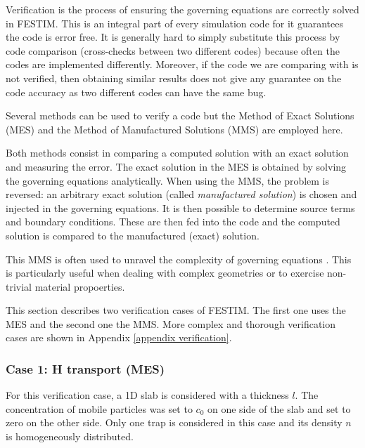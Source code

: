 Verification is the process of ensuring the governing equations are correctly solved in FESTIM.
This is an integral part of every simulation code for it guarantees the code is error free.
It is generally hard to simply substitute this process by code comparison (cross-checks between two different codes) because often the codes are implemented differently.
Moreover, if the code we are comparing with is not verified, then obtaining similar results does not give any guarantee on the code accuracy as two different codes can have the same bug.

Several methods can be used to verify a code but the Method of Exact Solutions (MES) and the Method of Manufactured Solutions (MMS) are employed here.

Both methods consist in comparing a computed solution with an exact solution and measuring the error.
The exact solution in the MES is obtained by solving the governing equations analytically.
When using the MMS, the problem is reversed: an arbitrary exact solution (called \textit{manufactured solution}) is chosen and injected in the governing equations.
It is then possible to determine source terms and boundary conditions.
These are then fed into the code and the computed solution is compared to the manufactured (exact) solution.

This MMS is often used to unravel the complexity of governing equations .
This is particularly useful when dealing with complex geometries or to exercise non-trivial material propoerties.

This section describes two verification cases of FESTIM.
The first one uses the MES and the second one the MMS.
More complex and thorough verification cases are shown in Appendix \ref{appendix verification}.

\subsubsection{Case 1: H transport (MES)} \label{analytical}


For this verification case, a 1D slab is considered with a thickness $l$.
The concentration of mobile particles was set to $c_0$ on one side of the slab and set to zero on the other side.
Only one trap is considered in this case and its density $n$ is homogeneously distributed.


